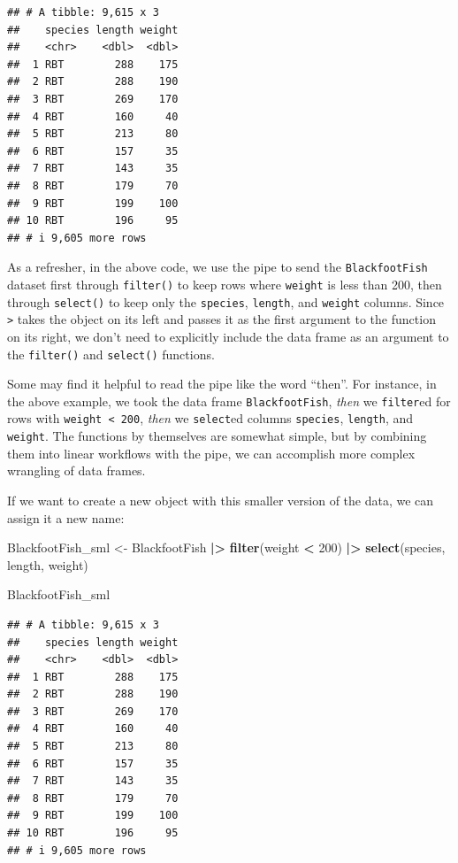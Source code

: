 \documentclass[
  10pt,
  letterpaper,
  twoside,
  openright]{book}
\newenvironment{Shaded}{\begin{snugshade}}{\end{snugshade}}
\newcommand{\DecValTok}[1]{\textcolor[rgb]{0.00,0.00,0.81}{#1}}
\newcommand{\FunctionTok}[1]{\textcolor[rgb]{0.13,0.29,0.53}{\textbf{#1}}}
\newcommand{\NormalTok}[1]{#1}
\newcommand{\OtherTok}[1]{\textcolor[rgb]{0.56,0.35,0.01}{#1}}
\newcommand{\SpecialCharTok}[1]{\textcolor[rgb]{0.81,0.36,0.00}{\textbf{#1}}}
\begin{document}
\begin{verbatim}
## # A tibble: 9,615 x 3
##    species length weight
##    <chr>    <dbl>  <dbl>
##  1 RBT        288    175
##  2 RBT        288    190
##  3 RBT        269    170
##  4 RBT        160     40
##  5 RBT        213     80
##  6 RBT        157     35
##  7 RBT        143     35
##  8 RBT        179     70
##  9 RBT        199    100
## 10 RBT        196     95
## # i 9,605 more rows
\end{verbatim}

As a refresher, in the above code, we use the pipe to send the
\texttt{BlackfootFish} dataset first through \texttt{filter()} to keep
rows where \texttt{weight} is less than 200, then through
\texttt{select()} to keep only the \texttt{species}, \texttt{length},
and \texttt{weight} columns. Since \texttt{\textbar{}\textgreater{}}
takes the object on its left and passes it as the first argument to the
function on its right, we don't need to explicitly include the data
frame as an argument to the \texttt{filter()} and \texttt{select()}
functions.

Some may find it helpful to read the pipe like the word ``then''. For
instance, in the above example, we took the data frame
\texttt{BlackfootFish}, \emph{then} we \texttt{filter}ed for rows with
\texttt{weight\ \textless{}\ 200}, \emph{then} we \texttt{select}ed
columns \texttt{species}, \texttt{length}, and \texttt{weight}. The
functions by themselves are somewhat simple, but by combining them into
linear workflows with the pipe, we can accomplish more complex wrangling
of data frames.

If we want to create a new object with this smaller version of the data,
we can assign it a new name:

\begin{Shaded}
\begin{Highlighting}[]
\NormalTok{BlackfootFish\_sml }\OtherTok{\textless{}{-}}\NormalTok{ BlackfootFish }\SpecialCharTok{|\textgreater{}}
  \FunctionTok{filter}\NormalTok{(weight }\SpecialCharTok{\textless{}} \DecValTok{200}\NormalTok{) }\SpecialCharTok{|\textgreater{}}
  \FunctionTok{select}\NormalTok{(species, length, weight)}

\NormalTok{BlackfootFish\_sml}
\end{Highlighting}
\end{Shaded}

\begin{verbatim}
## # A tibble: 9,615 x 3
##    species length weight
##    <chr>    <dbl>  <dbl>
##  1 RBT        288    175
##  2 RBT        288    190
##  3 RBT        269    170
##  4 RBT        160     40
##  5 RBT        213     80
##  6 RBT        157     35
##  7 RBT        143     35
##  8 RBT        179     70
##  9 RBT        199    100
## 10 RBT        196     95
## # i 9,605 more rows
\end{verbatim}
\end{document}
